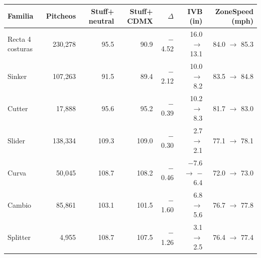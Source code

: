 \begin{tabular}{lrrrrrr}
\toprule
Familia & Pitcheos & Stuff+ neutral & Stuff+ CDMX & $\Delta$ & IVB (in) & ZoneSpeed (mph) \\
\midrule
Recta 4 costuras & 230,278 & 95.5 & 90.9 & \ensuremath{-}4.52 & 16.0 $\to$ 13.1 & 84.0 $\to$ 85.3 \\
Sinker & 107,263 & 91.5 & 89.4 & \ensuremath{-}2.12 & 10.0 $\to$ 8.2 & 83.5 $\to$ 84.8 \\
Cutter & 17,888 & 95.6 & 95.2 & \ensuremath{-}0.39 & 10.2 $\to$ 8.3 & 81.7 $\to$ 83.0 \\
Slider & 138,334 & 109.3 & 109.0 & \ensuremath{-}0.30 & 2.7 $\to$ 2.1 & 77.1 $\to$ 78.1 \\
Curva & 50,045 & 108.7 & 108.2 & \ensuremath{-}0.46 & \ensuremath{-}7.6 $\to$ \ensuremath{-}6.4 & 72.0 $\to$ 73.0 \\
Cambio & 85,861 & 103.1 & 101.5 & \ensuremath{-}1.60 & 6.8 $\to$ 5.6 & 76.7 $\to$ 77.8 \\
Splitter & 4,955 & 108.7 & 107.5 & \ensuremath{-}1.26 & 3.1 $\to$ 2.5 & 76.4 $\to$ 77.4 \\
\bottomrule
\end{tabular}
